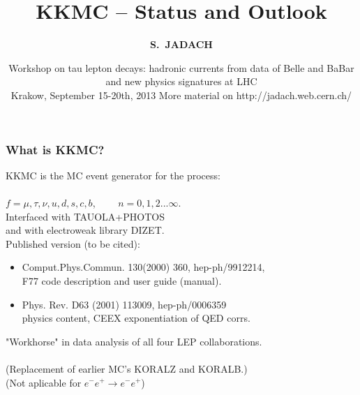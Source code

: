 \documentclass{beamer}
\title[Monte Carlo Methods] %
{ {\bf KKMC -- Status and Outlook}
} %
\author[S.~Jadach] %
{\Large\bf S.~JADACH }
\institute[Universities of Somewhere and Elsewhere] %
{ {\large\crd IFJ-PAN, Krak\'ow, Poland}\\
  {~~~}\\
  {\footnotesize
  Partly supported by Polish Government grant\\
  {\em Narodowe Centrum Nauki} DEC-2011/03/B/ST2/02632
}}
\date[Short Occasion] %
{\small Workshop on 
   tau lepton decays: hadronic currents from data of  Belle and BaBar 
   and new physics signatures at LHC\\
   Krakow,
   September 15-20th, 2013
\vskip 4mm
 \footnotesize
  More material on
  http://jadach.web.cern.ch/
}
\newcommand{\cbl}{\color{blue}}
\newcommand{\cmg}{\color{magenta}}
\begin{document}
\begin{frame}
  \titlepage
\end{frame}


\begin{frame}[fragile]
\frametitle{\bf What is KKMC?}
{\large
KKMC is the MC event generator for the process:\\
~~~~~~~~~~~~~~\fbox{\cbl $e^-e^+ \to f\bar{f}+ n\gamma$}\\
{\cbl $f=\mu,\tau,\nu,u,d,s,c,b$,~~~~ $n=0,1,2...\infty$.}
}\\
Interfaced with TAUOLA+PHOTOS\\
and with electroweak library DIZET.\\

Published version \fbox{\cmg 4.13} (to be cited):
\begin{itemize}
\item
Comput.Phys.Commun. 130(2000) 360, hep-ph/9912214,\\
F77 code description and user guide (manual).
\item
Phys. Rev. D63 (2001) 113009, hep-ph/0006359\\
physics content, CEEX exponentiation of QED corrs.\\
\end{itemize}
"Workhorse" in data analysis of all four LEP collaborations.\\
~~~\\
\footnotesize
(Replacement of earlier MC's KORALZ and KORALB.)\\
(Not aplicable for  $e^-e^+ \to e^-e^+$)

\end{frame}
\end{document}
